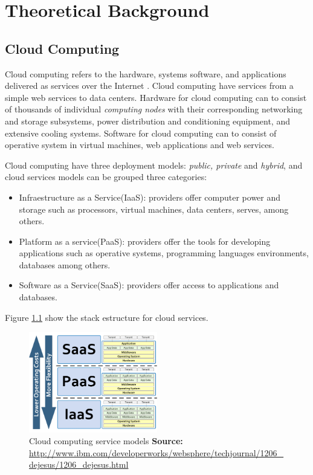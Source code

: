 \chapter{Theoretical Background}

\section{Cloud Computing}
Cloud computing refers to the hardware, systems software, and applications delivered as services over the Internet \cite{cloud}. Cloud computing have services from a simple web services to data centers. Hardware for cloud computing can to consist of thousands of individual \emph{computing nodes} with their corresponding networking and storage subsystems, power distribution and conditioning equipment, and extensive cooling systems. Software for cloud computing can to consist of operative system in virtual machines, web applications and web services. 

Cloud computing have three deployment models: \emph{public, private} and \emph{hybrid}, and cloud services models can be grouped three categories:
\begin{itemize}
  \item Infraestructure as a Service(IaaS): providers offer computer power and   storage such as processors, virtual machines, data centers, serves, among others.
  \item Platform as a service(PaaS): providers offer the tools for developing applications such as operative systems, programming languages environments, databases among others.
  \item Software as a Service(SaaS): providers offer access to applications and databases.
\end{itemize}  

Figure \ref{cloud_services} show the stack estructure for cloud services.

\begin{figure}[!h]
\centering
\includegraphics[width=0.5\textwidth]{images/cloud_services}
\caption[Cloud computing service models]{Cloud computing service models 
\textbf{Source:} \url{http://www.ibm.com/developerworks/websphere/techjournal/1206_dejesus/1206_dejesus.html}}
\label{cloud_services}
\end{figure}

